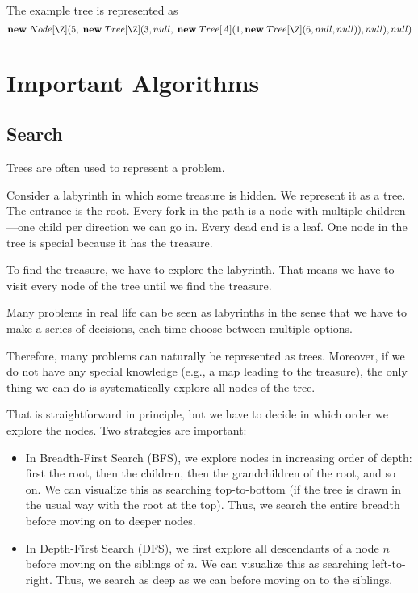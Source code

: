 The example tree is represented as
\[\anew{Node[\Z]}{5,\; \anew{Tree[\Z]}{3,null, \;\anew{Tree[A]}{1, \anew{Tree[\Z]}{6,null,null}}, null}, null}\]

\section{Important Algorithms}

\subsection{Search}

Trees are often used to represent a problem.

\begin{example}
Consider a labyrinth in which some treasure is hidden.
We represent it as a tree.
The entrance is the root.
Every fork in the path is a node with multiple children---one child per direction we can go in.
Every dead end is a leaf.
One node in the tree is special because it has the treasure.

To find the treasure, we have to explore the labyrinth.
That means we have to visit every node of the tree until we find the treasure.
\end{example}

Many problems in real life can be seen as labyrinths in the sense that we have to make a series of decisions, each time choose between multiple options.

Therefore, many problems can naturally be represented as trees.
Moreover, if we do not have any special knowledge (e.g., a map leading to the treasure), the only thing we can do is systematically explore all nodes of the tree.

That is straightforward in principle, but we have to decide in which order we explore the nodes.
Two strategies are important:
\begin{itemize}
\item In Breadth-First Search (BFS), we explore nodes in increasing order of depth: first the root, then the children, then the grandchildren of the root, and so on.
We can visualize this as searching top-to-bottom (if the tree is drawn in the usual way with the root at the top).
Thus, we search the entire breadth before moving on to deeper nodes.
\item In Depth-First Search (DFS), we first explore all descendants of a node $n$ before moving on the siblings of $n$.
We can visualize this as searching left-to-right.
Thus, we search as deep as we can before moving on to the siblings.
\end{itemize}

